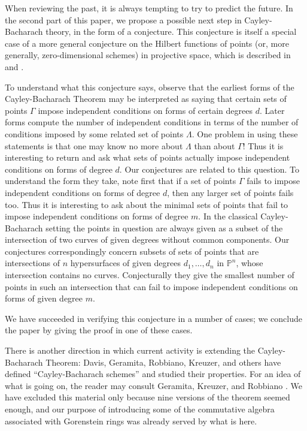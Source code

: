 \documentclass{bull-l}
\theoremstyle{pplain}
\theoremstyle{definition}
\begin{document}
When reviewing the past, it is always tempting to try to predict the future. 
In the second part of this paper, we propose a possible next step in
Cayley-Bacharach theory, in the form of a conjecture.  This conjecture is
itself a special case of a more general conjecture on the Hilbert functions of 
points (or, more generally, zero-dimensional schemes) in projective space, which
is described in \cite{EGH1} and \cite{EGH2}.

To understand what this conjecture says, observe that the earliest forms of the
Cayley-Bacharach Theorem may be interpreted as saying that certain sets of 
points $\Gamma$ impose independent conditions on forms of certain degrees $d$. 
Later forms compute the number of independent conditions in terms of the number
of conditions imposed by some related set of points $\Lambda$.  One problem in
using these statements is that one may know no more about $\Lambda$ than about
$\Gamma$!   Thus it is interesting to return and ask what sets of points 
actually impose independent conditions on forms of degree $d$.  Our conjectures
are related to this question.  To understand the form they take, note first
that if a set of points $\Gamma$ fails to impose independent conditions on
forms of degree $d$, then any larger set of points fails too.  Thus it is
interesting to ask about the minimal sets of points that fail to impose
independent conditions on forms of degree $m$.  In the classical 
Cayley-Bacharach setting the points in question are always given as a subset of
the intersection of two curves of given degrees without common components.  Our 
conjectures correspondingly concern subsets of sets of points that are
intersections of $n$ hypersurfaces of given degrees $d_1,\dots,d_n$ in
$\mathbb{P}^n$, whose intersection contains no curves.  Conjecturally they give
the smallest number of points in such an intersection that can fail to impose
independent conditions on forms of given degree $m$.

We have succeeded in verifying this conjecture in a number of cases; we
conclude the paper by giving the proof in one of these cases.

There is another direction in which current activity is extending the 
Cayley-Bacharach Theorem: Davis, Geramita, Robbiano, Kreuzer, and others have
defined ``Cayley-Bacharach schemes'' and studied their properties.  For an idea
of what is going on, the reader may consult Geramita, Kreuzer, and Robbiano
\cite{GKR}.  We have  excluded this material only because nine versions of the 
theorem seemed enough, and our purpose of introducing some of the commutative 
algebra associated with Gorenstein rings was already served by what is here.
\end{document}
